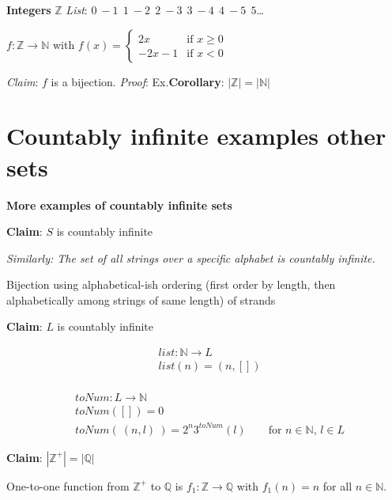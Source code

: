 \documentclass[12pt, oneside]{article}
\begin{document}
{\bf Integers} $\mathbb{Z}$ \hfill {\it List}:  $0~-1~~1~-2~~2~-3~~3~-4~~4~-5~~5$\ldots

$f: \mathbb{Z} \to \mathbb{N}$ with $f(x) = \begin{cases}2x &\text{if $x \geq 0$} \\-2x-1 &\text{if $x < 0$} \end{cases}$

{\it Claim}: $f$ is a bijection.  {\it Proof}: Ex.\hfill {\bf Corollary}: $ | \mathbb{Z} | = |\mathbb{N}|$
\newpage


 \vfill
\section*{Countably infinite examples other sets}


{\bf More examples of countably infinite sets}

{\bf Claim}: $S$ is countably infinite

{\it Similarly: The set of all strings over a specific alphabet is countably infinite.}
\begin{center}
Bijection using alphabetical-ish ordering
(first order by length, then alphabetically among strings of same length) 
of strands
\end{center}

\vspace{50pt}


{\bf Claim}: $L$ is countably infinite

\begin{multicols}{2}
\begin{align*}
    &list: \mathbb{N} \to L \\
    &list(n) = (n, []) \\
    &
\end{align*}

\begin{align*}
    &toNum: L \to \mathbb{N} \\
    &toNum([]) = 0 \\
    &toNum( ~(n,l)~) = 2^n 3^{toNum}(l) \qquad \text{for $n \in \mathbb{N}$, $l \in L$}
\end{align*}
\end{multicols}
\vspace{30pt}

{\bf Claim}: $|\mathbb{Z}^+| = |\mathbb{Q}|$ 

One-to-one function from $\mathbb{Z}^+$ to $\mathbb{Q}$
is $f_1: \mathbb{Z} \to \mathbb{Q}$ with $f_1(n) = n$ for all 
$n \in \mathbb{N}$.
\end{document}
